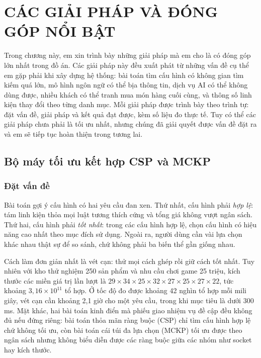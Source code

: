 \chapter{CÁC GIẢI PHÁP VÀ ĐÓNG GÓP NỔI BẬT}
\label{chap:giai-phap}

Trong chương này, em xin trình bày những giải pháp mà em cho là có đóng góp lớn nhất trong đồ án. Các giải pháp này đều xuất phát từ những vấn đề cụ thể em gặp phải khi xây dựng hệ thống: bài toán tìm cấu hình có không gian tìm kiếm quá lớn, mô hình ngôn ngữ có thể bịa thông tin, dịch vụ AI có thể không dùng được, nhiều khách có thể tranh mua món hàng cuối cùng, và thông số linh kiện thay đổi theo từng danh mục. Mỗi giải pháp được trình bày theo trình tự: đặt vấn đề, giải pháp và kết quả đạt được, kèm số liệu đo thực tế. Tuy có thể các giải pháp chưa phải là tối ưu nhất, nhưng chúng đã giải quyết được vấn đề đặt ra và em sẽ tiếp tục hoàn thiện trong tương lai.

\section{Bộ máy tối ưu kết hợp CSP và MCKP}
\label{sec:engine}

\subsection{Đặt vấn đề}

Bài toán gợi ý cấu hình có hai yêu cầu đan xen. Thứ nhất, cấu hình phải \emph{hợp lệ}: tám linh kiện thỏa mọi luật tương thích cứng và tổng giá không vượt ngân sách. Thứ hai, cấu hình phải \emph{tốt nhất}: trong các cấu hình hợp lệ, chọn cấu hình có hiệu năng cao nhất theo mục đích sử dụng. Ngoài ra, người dùng cần vài lựa chọn khác nhau thật sự để so sánh, chứ không phải ba biến thể gần giống nhau.

Cách làm đơn giản nhất là vét cạn: thử mọi cách ghép rồi giữ cách tốt nhất. Tuy nhiên với kho thử nghiệm 250 sản phẩm và nhu cầu chơi game 25 triệu, kích thước các miền giá trị lần lượt là $29 \times 34 \times 25 \times 32 \times 27 \times 25 \times 27 \times 22$, tức khoảng $3{,}16 \times 10^{11}$ tổ hợp. Ở tốc độ đo được khoảng 42 nghìn tổ hợp mỗi mili giây, vét cạn cần khoảng 2,1 giờ cho một yêu cầu, trong khi mục tiêu là dưới 300 ms. Mặt khác, hai bài toán kinh điển mà phiếu giao nhiệm vụ đề cập đều không đủ nếu đứng riêng: bài toán thỏa mãn ràng buộc (CSP) chỉ tìm cấu hình hợp lệ chứ không tối ưu, còn bài toán cái túi đa lựa chọn (MCKP) tối ưu được theo ngân sách nhưng không biểu diễn được các ràng buộc giữa các nhóm như socket hay kích thước.

